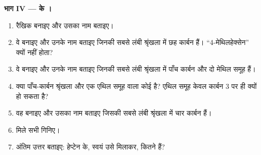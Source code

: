 \begin{problem}
\medskip
\noindent\textbf{भाग IV ---  के ।}
\begin{enumerate}[resume]
  \item रैखिक  बनाइए और उसका नाम बताइए।
  \item वे  बनाइए और उनके नाम बताइए जिनकी सबसे लंबी श्रृंखला में छह कार्बन
         हैं। ``4-मेथिलहेक्सेन'' क्यों नहीं होता?
  \item वे  बनाइए और उनके नाम बताइए जिनकी सबसे लंबी श्रृंखला में पाँच कार्बन
         और दो मेथिल समूह हैं।
  \item क्या पाँच-कार्बन श्रृंखला और एक एथिल समूह वाला कोई  है?
        एथिल समूह केवल कार्बन 3 पर ही क्यों हो सकता है?
  \item वह  बनाइए और उसका नाम बताइए जिसकी सबसे लंबी श्रृंखला में चार कार्बन
         हैं।
  \item मिले सभी  गिनिए।
  \item अंतिम उत्तर बताइए: हेप्टेन के, स्वयं उसे मिलाकर, कितने  हैं?
\end{enumerate}
\end{problem}
